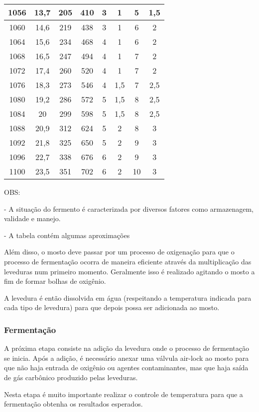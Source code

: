 \begin{table}[h]
\begin{tabular}{|c|c|c|c|c|c|c|c|}
1056 & 13,7 & 205 & 410 & 3 & 1 & 5 & 1,5 \\ \hline
1060 & 14,6 & 219 & 438 & 3 & 1 & 6 & 2 \\ \hline
1064 & 15,6 & 234 & 468 & 4 & 1 & 6 & 2 \\ \hline
1068 & 16,5 & 247 & 494 & 4 & 1 & 7 & 2 \\ \hline
1072 & 17,4 & 260 & 520 & 4 & 1 & 7 & 2 \\ \hline
1076 & 18,3 & 273 & 546 & 4 & 1,5 & 7 & 2,5 \\ \hline
1080 & 19,2 & 286 & 572 & 5 & 1,5 & 8 & 2,5 \\ \hline
1084 & 20 & 299 & 598 & 5 & 1,5 & 8 & 2,5 \\ \hline
1088 & 20,9 & 312 & 624 & 5 & 2 & 8 & 3 \\ \hline
1092 & 21,8 & 325 & 650 & 5 & 2 & 9 & 3 \\ \hline
1096 & 22,7 & 338 & 676 & 6 & 2 & 9 & 3 \\ \hline
1100 & 23,5 & 351 & 702 & 6 & 2 & 10 & 3 \\ \hline
\end{tabular}
\end{table}

OBS:

- A situação do fermento é caracterizada por diversos fatores como armazenagem, validade e manejo.

- A tabela contém algumas aproximações


Além disso, o mosto deve passar por um processo de oxigenação para que o processo de fermentação ocorra de maneira eficiente através da multiplicação das leveduras num primeiro momento. Geralmente isso é realizado agitando o mosto a fim de formar bolhas de oxigênio.

A levedura é então dissolvida em água (respeitando a temperatura indicada para cada tipo de levedura) para que depois possa ser adicionada ao mosto.


\subsubsection{Fermentação}

A próxima etapa consiste na adição da levedura onde o processo de fermentação se inicia. Após a adição, é necessário anexar uma válvula air-lock ao mosto para que não haja entrada de oxigênio ou agentes contaminantes, mas que haja saída de gás carbônico produzido pelas leveduras.

Nesta etapa é muito importante realizar o controle de temperatura para que a fermentação obtenha os resultados esperados.

